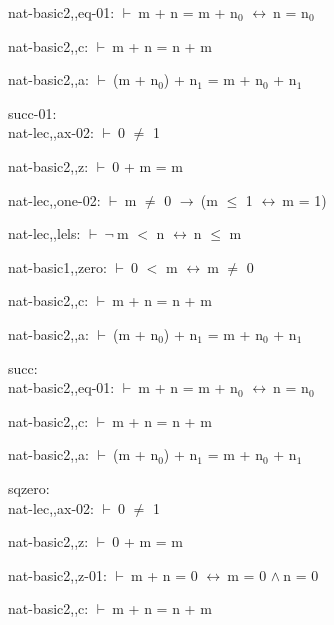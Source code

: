 \documentclass[a4paper]{article}
\newcommand{\Fol}{\mbox{$\vdash\ $}}
\newcommand{\Not}{\mbox{$\neg\ $}}
\newcommand{\And}{\mbox{$\wedge\ $}}
\newcommand{\Imp}{\mbox{$\rightarrow\ $}}
\newcommand{\Equiv}{\mbox{$\leftrightarrow\ $}}
\begin{document}
nat-basic2,,eq-01: 
 \Fol m + n = m + $\mbox{n}_{0}$ \Equiv n = $\mbox{n}_{0}$



nat-basic2,,c: 
 \Fol m + n = n + m



nat-basic2,,a: 
 \Fol (m + $\mbox{n}_{0}$) + $\mbox{n}_{1}$ = m + $\mbox{n}_{0}$ + $\mbox{n}_{1}$



\bigskip

succ-01:\\ nat-lec,,ax-02: 
 \Fol 0 $\neq$ 1



nat-basic2,,z: 
 \Fol 0 + m = m



nat-lec,,one-02: 
 \Fol m $\neq$ 0 \Imp (m $\le$ 1 \Equiv m = 1)



nat-lec,,lels: 
 \Fol \Not m $<$ n \Equiv n $\le$ m



nat-basic1,,zero: 
 \Fol 0 $<$ m \Equiv m $\neq$ 0



nat-basic2,,c: 
 \Fol m + n = n + m



nat-basic2,,a: 
 \Fol (m + $\mbox{n}_{0}$) + $\mbox{n}_{1}$ = m + $\mbox{n}_{0}$ + $\mbox{n}_{1}$



\bigskip

succ:\\ nat-basic2,,eq-01: 
 \Fol m + n = m + $\mbox{n}_{0}$ \Equiv n = $\mbox{n}_{0}$



nat-basic2,,c: 
 \Fol m + n = n + m



nat-basic2,,a: 
 \Fol (m + $\mbox{n}_{0}$) + $\mbox{n}_{1}$ = m + $\mbox{n}_{0}$ + $\mbox{n}_{1}$



\bigskip

sqzero:\\ nat-lec,,ax-02: 
 \Fol 0 $\neq$ 1



nat-basic2,,z: 
 \Fol 0 + m = m



nat-basic2,,z-01: 
 \Fol m + n = 0 \Equiv m = 0 \And n = 0



nat-basic2,,c: 
 \Fol m + n = n + m
\end{document}
